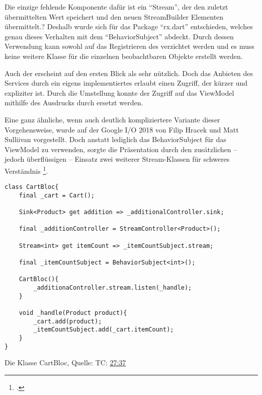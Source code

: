 Die einzige fehlende Komponente dafür ist ein \enquote{Stream},
der den zuletzt übermittelten Wert speichert und den neuen StreamBuilder Elementen übermittelt.?
Deshalb wurde sich für das Package \enquote{rx.dart} entschieden,
welches genau dieses Verhalten mit dem \enquote{BehaviorSubject} abdeckt.
Durch dessen Verwendung kann sowohl auf das Registrieren des  verzichtet werden
und es muss keine weitere Klasse für die einzelnen beobachtbaren Objekte erstellt werden.

Auch der  erscheint auf den ersten Blick als sehr nützlich.
Doch das Anbieten des Services durch ein eigens implementiertes  erlaubt einen Zugriff,
der kürzer und expliziter ist.
Durch die Umstellung konnte der Zugriff auf das ViewModel mithilfe des Ausdrucks  durch  ersetzt werden.

Eine ganz ähnliche, wenn auch deutlich kompliziertere Variante dieser Vorgehensweise, wurde auf der Google I/O 2018 von Filip Hracek und Matt Sulliivan vorgestellt. Doch anstatt lediglich das BehaviorSubject für das ViewModel zu verwenden, sorgte die Präsentation durch den zusätzlichen -- jedoch überflüssigen -- Einsatz zwei weiterer Stream-Klassen für schweres Verständnis \Lst{\ref{lst:CartBloc}}\footcite[][TC: \href{https://youtu.be/RS36gBEp8OI?t=1657}{27:37}]{GoogleIO18}.

\ifIncludeFigures
  \begin{listing}[h]
    \begin{verbatim}
class CartBloc{
    final _cart = Cart();

    Sink<Product> get addition => _additionalController.sink;

    final _additionController = StreamController<Product>();

    Stream<int> get itemCount => _itemCountSubject.stream;

    final _itemCountSubject = BehaviorSubject<int>();

    CartBloc(){
        _additionaController.stream.listen(_handle);
    }

    void _handle(Product product){
        _cart.add(product);
        _itemCountSubject.add(_cart.itemCount);
    }
}
\end{verbatim}
    \caption[Die Klasse CartBloc]{Die Klasse CartBloc, Quelle: \cite{GoogleIO18} TC: \href{https://youtu.be/RS36gBEp8OI?t=1657}{27:37} \footnotemark}
    \label{lst:CartBloc}
  \end{listing}
\fi

